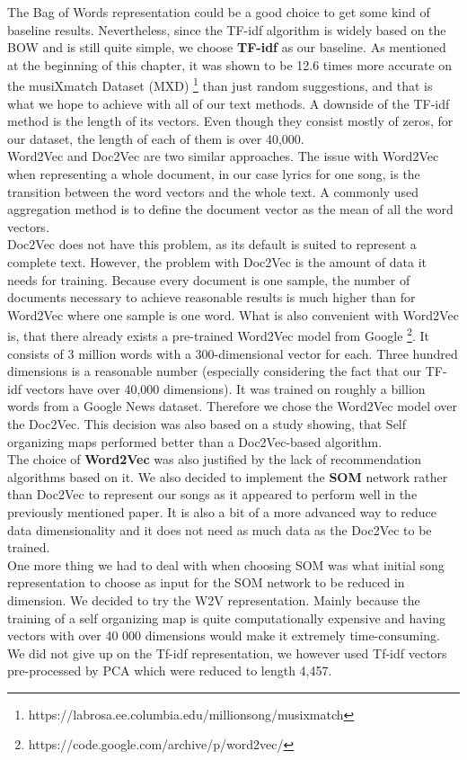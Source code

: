 The Bag of Words representation could be a good choice to get some kind of baseline results. Nevertheless, since the TF-idf algorithm is widely based on the BOW and is still quite simple, we choose \textbf{TF-idf} as our baseline. As mentioned at the beginning of this chapter, it was shown to be 12.6 times more accurate on the musiXmatch Dataset (MXD) \footnote{https://labrosa.ee.columbia.edu/millionsong/musixmatch} than just random suggestions, and that is what we hope to achieve with all of our text methods. A downside of the TF-idf method is the length of its vectors. Even though they consist mostly of zeros, for our dataset, the length of each of them is over 40,000. \\
Word2Vec and Doc2Vec are two similar approaches. The issue with Word2Vec when representing a whole document, in our case lyrics for one song, is the transition between the word vectors and the whole text. A commonly used aggregation method is to define the document vector as the mean of all the word vectors. \\ 
Doc2Vec does not have this problem, as its default is suited to represent a complete text. However, the problem with Doc2Vec is the amount of data it needs for training. Because every document is one sample, the number of documents necessary to achieve reasonable results is much higher than for Word2Vec where one sample is one word. What is also convenient with Word2Vec is, that there already exists a pre-trained Word2Vec model from Google \footnote{https://code.google.com/archive/p/word2vec/}. It consists of 3 million words with a 300-dimensional vector for each. Three hundred dimensions is a reasonable number (especially considering the fact that our TF-idf vectors have over 40,000 dimensions). It was trained on roughly a billion words from a Google News dataset. Therefore we chose the Word2Vec model over the Doc2Vec. This decision was also based on a study \cite{inproceedings} showing, that Self organizing maps performed better than a Doc2Vec-based algorithm. \\
The choice of \textbf{Word2Vec} was also justified by the lack of recommendation algorithms based on it. We also decided to implement the \textbf{SOM} network rather than Doc2Vec to represent our songs as it appeared to perform well in the previously mentioned paper. It is also a bit of a more advanced way to reduce data dimensionality and it does not need as much data as the Doc2Vec to be trained. \\
One more thing we had to deal with when choosing SOM was what initial song representation to choose as input for the SOM network to be reduced in dimension. We decided to try the W2V representation. Mainly because the training of a self organizing map is quite computationally expensive and having vectors with over 40 000 dimensions would make it extremely time-consuming. We did not give up on the Tf-idf representation, we however used Tf-idf vectors pre-processed by PCA which were reduced to length 4,457. 

